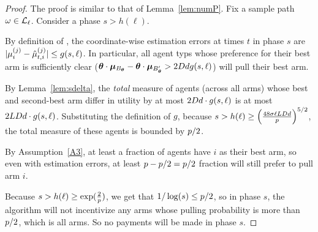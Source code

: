 \begin{proof}
The proof is similar to that of Lemma~\ref{lem:numP}.
Fix a sample path $\omega \in {\mathcal L}_{\ell}$.
Consider a phase $s > h(\ell)$.

By definition of \Env{\ell}, the coordinate-wise estimation errors at
times $t$ in phase $s$ are
$|\mu_{i}^{(j)} - \hat{\mu}_{t,i}^{(j)}| \leq g(s,\ell)$.
In particular, all agent typs \AgV whose preference for their best arm
is sufficiently clear
($\bm{\theta} \cdot \bm{\mu}_{B_{\bm{\theta}}} - \bm{\theta} \cdot \bm{\mu}_{B'_{\bm{\theta}}}
> 2D d g(s,\ell)$) will pull their best arm.

By Lemma~\ref{lem:sdelta}, the \emph{total} measure of agents (across
all arms) whose best and second-best arm differ in utility by at most
$2D d \cdot g(s,\ell)$ is at most $2L D d \cdot g(s,\ell)$.
Substituting the definition of $g$, because 
$s > h(\ell) \geq \left( \frac{48 \sigma \ell L D d}{p} \right)^{5/2}$,
the total measure of these agents is bounded by $p/2$.

By Assumption~\ref{A3}, at least a \MinProb fraction of agents have
$i$ as their best arm, so even with estimation errors, at least
$p - p/2 = p/2$ fraction will still prefer to
pull arm $i$.

Because $s > h(\ell) \geq \exp(\frac{2}{p})$, 
we get that $1/\log(s) \leq p/2$, so in phase $s$,
the algorithm will not incentivize any arms whose pulling probability
is more than $p/2$, which is all arms.
So no payments will be made in phase $s$.
\end{proof}


